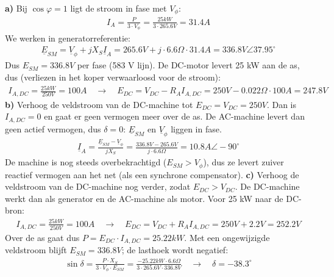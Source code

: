\begin{oefenblok}
\newline
\textbf{a)}
Bij $\cos\varphi = 1$ ligt de stroom in fase met $V_\phi$:
\begin{align*}
    I_A = \frac{P}{3 \cdot V_\phi} = \frac{25 kW}{3 \cdot 265.6 V} = 31.4 A
\end{align*}
We werken in generatorreferentie:
\begin{align*}
    \underline{E}_{SM} = \underline{V}_\phi + j X_S \underline{I}_A = 265.6 V + j \cdot 6.6 \Omega \cdot 31.4 A = 336.8 V \angle 37.95^\circ
\end{align*}
Dus $E_{SM} = 336.8 V$ per fase (583 V lijn).
De DC-motor levert 25 kW aan de as, dus (verliezen in het koper verwaarloosd voor de stroom):
\begin{align*}
    I_{A,DC} = \frac{25 kW}{250 V} = 100 A \quad \rightarrow \quad E_{DC} = V_{DC} - R_A I_{A,DC} = 250 V - 0.022 \Omega \cdot 100 A = 247.8 V
\end{align*}
\textbf{b)}
Verhoog de veldstroom van de DC-machine tot $E_{DC} = V_{DC} = 250 V$.
Dan is $I_{A,DC} = 0$ en gaat er geen vermogen meer over de as.
De AC-machine levert dan geen actief vermogen, dus $\delta = 0$: $\underline{E}_{SM}$ en
$\underline{V}_\phi$ liggen in fase.
\begin{align*}
    \underline{I}_A = \frac{\underline{E}_{SM} - \underline{V}_\phi}{j X_S} = \frac{336.8 V - 265.6 V}{j \cdot 6.6 \Omega} = 10.8 A \angle -90^\circ
\end{align*}
De machine is nog steeds overbekrachtigd ($E_{SM} > V_\phi$), dus ze levert zuiver reactief
vermogen aan het net (als een synchrone compensator).
\newline
\textbf{c)}
Verhoog de veldstroom van de DC-machine nog verder, zodat $E_{DC} > V_{DC}$.
De DC-machine werkt dan als generator en de AC-machine als motor.
Voor 25 kW naar de DC-bron:
\begin{align*}
    I_{A,DC} = \frac{25 kW}{250 V} = 100 A \quad \rightarrow \quad E_{DC} = V_{DC} + R_A I_{A,DC} = 250 V + 2.2 V = 252.2 V
\end{align*}
Over de as gaat dus $P = E_{DC} \cdot I_{A,DC} = 25.22 kW$.
Met een ongewijzigde veldstroom blijft $E_{SM} = 336.8 V$; de lasthoek wordt negatief:
\begin{align*}
    \sin\delta = \frac{P \cdot X_S}{3 \cdot V_\phi \cdot E_{SM}} = \frac{-25.22 kW \cdot 6.6 \Omega}{3 \cdot 265.6 V \cdot 336.8 V} \quad \rightarrow \quad \delta = -38.3^\circ
\end{align*}
\begin{align*}

\end{align*}
\end{oefenblok}
